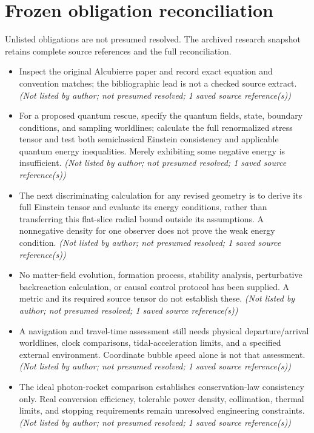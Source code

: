\documentclass[11pt]{article}
\begin{document}
\section{Frozen obligation reconciliation}
Unlisted obligations are not presumed resolved. The archived research snapshot retains complete source references and the full reconciliation.
\begin{itemize}
\item Inspect the original Alcubierre paper and record exact equation and convention matches; the bibliographic lead is not a checked source extract. \textit{ (Not listed by author; not presumed resolved; 1 saved source reference(s))}
\item For a proposed quantum rescue, specify the quantum fields, state, boundary conditions, and sampling worldlines; calculate the full renormalized stress tensor and test both semiclassical Einstein consistency and applicable quantum energy inequalities. Merely exhibiting some negative energy is insufficient. \textit{ (Not listed by author; not presumed resolved; 1 saved source reference(s))}
\item The next discriminating calculation for any revised geometry is to derive its full Einstein tensor and evaluate its energy conditions, rather than transferring this flat-slice radial bound outside its assumptions. A nonnegative density for one observer does not prove the weak energy condition. \textit{ (Not listed by author; not presumed resolved; 1 saved source reference(s))}
\item No matter-field evolution, formation process, stability analysis, perturbative backreaction calculation, or causal control protocol has been supplied. A metric and its required source tensor do not establish these. \textit{ (Not listed by author; not presumed resolved; 1 saved source reference(s))}
\item A navigation and travel-time assessment still needs physical departure/arrival worldlines, clock comparisons, tidal-acceleration limits, and a specified external environment. Coordinate bubble speed alone is not that assessment. \textit{ (Not listed by author; not presumed resolved; 1 saved source reference(s))}
\item The ideal photon-rocket comparison establishes conservation-law consistency only. Real conversion efficiency, tolerable power density, collimation, thermal limits, and stopping requirements remain unresolved engineering constraints. \textit{ (Not listed by author; not presumed resolved; 1 saved source reference(s))}

\end{itemize}
\end{document}
